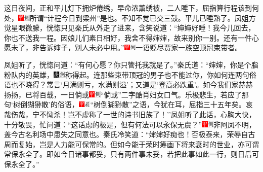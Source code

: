 这日夜间，正和平儿灯下拥炉倦绣，早命浓薰绣被，二人睡下，屈指算行程该到何处，{\includegraphics[width=3mm]{../Images/00002}\includegraphics[width=3mm]{../Images/00011}\footnotesize \kaishu 所谓``计程今日到梁州''是也。}不知不觉已交三鼓。平儿已睡熟了。凤姐方觉星眼微朦，恍惚只见秦氏从外走了进来，含笑说道：``婶婶好睡！我今儿回去，你也不送我一程。因娘儿们素日相好，我舍不得婶婶，故来别你一别。还有一件心愿未了，非告诉婶子，别人未必中用。''{\includegraphics[width=3mm]{../Images/00002}\includegraphics[width=3mm]{../Images/00011}\footnotesize \kaishu 一语贬尽贾家一族空顶冠束带者。}

凤姐听了，恍惚问道：``有何心愿？你只管托我就是了。''秦氏道：``婶婶，你是个脂粉队内的英雄，{\includegraphics[width=3mm]{../Images/00004}\includegraphics[width=3mm]{../Images/00011}\footnotesize \kaishu 称得起。}连那些束带顶冠的男子也不能过你，你如何连两句俗语也不晓得？常言`月满则亏，水满则溢'；又道是`登高必跌重'。如今我们家赫赫扬扬，已将百载，一日倘或{\includegraphics[width=3mm]{../Images/00002}\includegraphics[width=3mm]{../Images/00011}\footnotesize \kaishu ``倘或''二字酷肖妇女口气。}乐极悲生，若应了那句`树倒猢狲散'的俗语，{\includegraphics[width=3mm]{../Images/00002}\includegraphics[width=3mm]{../Images/00010}\footnotesize \kaishu ``树倒猢狲散''之语，今犹在耳，屈指三十五年矣。哀哉伤哉，宁不恸杀！}岂不虚称了一世的诗书旧族了！''凤姐听了此话，心胸大快，十分敬畏，忙问道：``这话虑的极是，但有何法可以永保无虞？''{\includegraphics[width=3mm]{../Images/00002}\includegraphics[width=3mm]{../Images/00011}\footnotesize \kaishu 非阿凤不明，盖今古名利场中患失之同意也。}秦氏冷笑道：``婶婶好痴也！否极泰来，荣辱自古周而复始，岂是人力能可保常的。但如今能于荣时筹画下将来衰时的世业，亦可谓常保永全了。即如今日诸事都妥，只有两件事未妥，若把此事如此一行，则日后可保永全了。''

